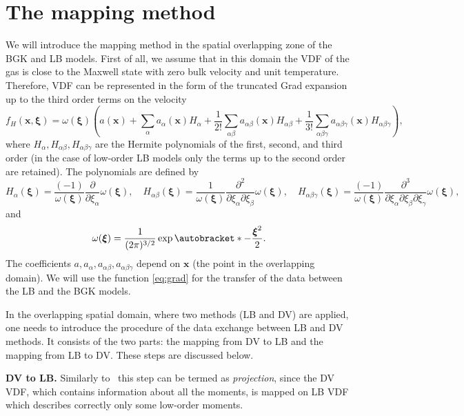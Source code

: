 \documentclass{elsarticle} %
\newcommand{\pder}[2][]{\frac{\partial#1}{\partial#2}}
\newcommand{\pderder}[3][]{\frac{\partial^2#1}{\partial#2\partial#3}}
\newcommand{\pderderder}[4][]{\frac{\partial^3#1}{\partial#2\partial#3\partial#4}}
\DeclarePairedDelimiter\autobracket()       %
\newcommand{\br}[1]{\autobracket*{#1}}
\newcommand{\bxi}{\boldsymbol{\xi}}
\newcommand{\bx}{\boldsymbol{x}}
\newcommand{\DV}{\mathrm{DV}}
\newcommand{\Aa}{a_{\alpha}}
\newcommand{\Aab}{a_{\alpha\beta}}
\newcommand{\Aabg}{a_{\alpha\beta\gamma}}
\newcommand{\Ha}{H_{\alpha}}
\newcommand{\Hab}{H_{\alpha\beta}}
\newcommand{\Habg}{H_{\alpha\beta\gamma}}
\begin{document}
\section{The mapping method}\label{sec:mapping}

We will introduce the mapping method in the spatial overlapping zone of the BGK and LB models.
First of all, we assume that in this domain the VDF of the gas is close to the Maxwell state with zero bulk velocity and unit temperature.
Therefore, VDF can be represented in the form of the truncated Grad expansion up to the third order terms on the velocity
\begin{equation}\label{eq:grad}
    f_H(\bx,\bxi) = \omega(\bxi)\left(
        a(\bx) + \sum_{\alpha}\Aa(\bx)\Ha +
        \frac{1}{2!}\sum_{\alpha\beta}\Aab(\bx)\Hab +
        \frac{1}{3!}\sum_{\alpha\beta \gamma}\Aabg(\bx)\Habg
    \right),
\end{equation}
where $\Ha, \Hab, \Habg$ are the Hermite polynomials of the first, second, and third order
(in the case of low-order LB models only the terms up to the second order are retained).
The polynomials are defined by
\begin{equation}\label{eq:hermite}
    H_\alpha(\bxi) = \frac{(-1)}{\omega(\bxi)}\pder{\xi_\alpha}\omega(\bxi), \quad
    \Hab(\bxi) = \frac{1}{\omega(\bxi)}\pderder{\xi_\alpha}{\xi_\beta}\omega(\bxi), \quad
    \Habg(\bxi) = \frac{(-1)}{\omega(\bxi)}\pderderder{\xi_\alpha}{\xi_\beta}{\xi_\gamma}\omega(\bxi),
\end{equation}
and
\begin{equation}\label{eq:omega}
    \omega(\bxi) = \frac{1}{(2\pi)^{3/2}}\exp\br{ -\frac{\bxi^2}{2} }.
\end{equation}
The coefficients $a, \Aa, \Aab, \Aabg$ depend on $\bx$ (the point in the overlapping domain).
We will use the function \eqref{eq:grad} for the transfer of the data between the LB and the BGK models.

In the overlapping spatial domain, where two methods (LB and DV) are applied,
one needs to introduce the procedure of the data exchange between LB and DV methods.
It consists of the two parts: the mapping from DV to LB and the mapping from LB to DV.
These steps are discussed below.

{\bf DV to LB.}
Similarly to~\cite{Staso2016long} this step can be termed as \emph{projection},
since the DV VDF, which contains information about all the moments,
is mapped on LB VDF which describes correctly only some low-order moments.
\end{document}

